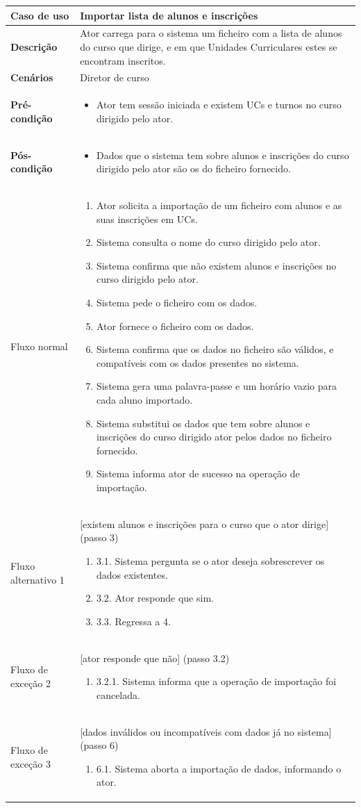 \documentclass[12pt, a4paper]{article}
\newenvironment{condition}{
    \begin{itemize}[wide=0pt]
        \vspace{-0.2cm}
}{
        \vspace{-0.5cm}
    \end{itemize}
}
\newcommand\flow[1]{
    Fluxo normal &
    \singlespacing
    \begin{enumerate}[wide=0pt]
        #1
        \vspace{-0.3cm}
    \end{enumerate} \\ \hline
}
\newcommand\otherflow[3]{
    #1 &
    #2
    \singlespacing
    \begin{enumerate}[wide=0pt]
        #3
        \vspace{-0.3cm}
    \end{enumerate} \\ \hline
}
\newenvironment{usecase}[5]{
    \begin{table}[H]
        \centering
        \begin{tabular}{|>{\centering\arraybackslash\bf}m{3cm}|m{13cm}|}
            \hline
            Caso de uso & \textbf{#1} \\

            \hline
            Descrição & #2 \\

            \hline
            Cenários & #3 \\

            \hline
            Pré-condição &
            \begin{condition}
                #4
            \end{condition} \\

            \hline
            Pós-condição &
            \begin{condition}
                #5
            \end{condition} \\

            \hline
}{
    \end{tabular}
\end{table}
}
\begin{document}
\begin{usecase}
    {Importar lista de alunos e inscrições}
    {
        Ator carrega para o sistema um ficheiro com a lista de alunos do curso que dirige, e em que
        Unidades Curriculares estes se encontram inscritos.
    }
    {Diretor de curso}
    {\item Ator tem sessão iniciada e existem UCs e turnos no curso dirigido pelo ator.}
    {
        \item Dados que o sistema tem sobre alunos e inscrições do curso dirigido pelo ator são os
            do ficheiro fornecido.
    }

    \flow{
        \item Ator solicita a importação de um ficheiro com alunos e as suas inscrições em UCs.
        \item Sistema consulta o nome do curso dirigido pelo ator.
        \item Sistema confirma que não existem alunos e inscrições no curso dirigido pelo ator.
        \item Sistema pede o ficheiro com os dados.
        \item Ator fornece o ficheiro com os dados.
        \item Sistema confirma que os dados no ficheiro são válidos, e compatíveis com os dados
            presentes no sistema.
        \item Sistema gera uma palavra-passe e um horário vazio para cada aluno importado.
        \item Sistema substitui os dados que tem sobre alunos e inscrições do curso dirigido ator
            pelos dados no ficheiro fornecido.
        \item Sistema informa ator de sucesso na operação de importação.
    }

    \otherflow{Fluxo alternativo 1}
        {[existem alunos e inscrições para o curso que o ator dirige] (passo 3)}{

        \item[3.1.] Sistema pergunta se o ator deseja sobrescrever os dados existentes.
        \item[3.2.] Ator responde que sim.
        \item[3.3.] Regressa a 4.
    }

    \otherflow{Fluxo de exceção 2}{[ator responde que não] (passo 3.2)}{
        \item[3.2.1.] Sistema informa que a operação de importação foi cancelada.
    }

    \otherflow{Fluxo de exceção 3}
        {[dados inválidos ou incompatíveis com dados já no sistema] (passo 6)}{

        \item[6.1.] Sistema aborta a importação de dados, informando o ator.
    }
\end{usecase}
\end{document}

